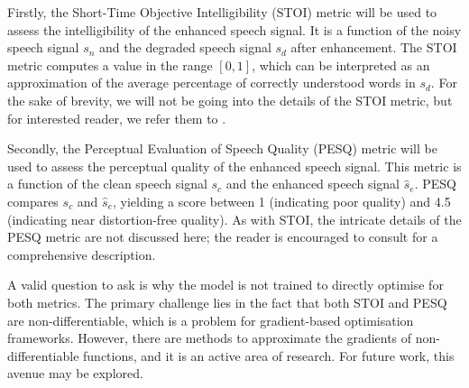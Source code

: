 \documentclass[logo,bsc,singlespacing,parskip,online]{infthesis}
\begin{document}
Firstly, the Short-Time Objective Intelligibility (STOI) \citep{taal_algorithm_2011} metric will be used to assess the intelligibility of the enhanced speech signal.
It is a function of the noisy speech signal $s_n$ and the degraded speech signal $s_d$ after enhancement.
The STOI metric computes a value in the range \([0, 1]\), which can be interpreted as an approximation of the average percentage of correctly understood words in $s_d$. 
For the sake of brevity, we will not be going into the details of the STOI metric, but for interested reader, we refer them to \citet{taal_algorithm_2011}.

Secondly, the Perceptual Evaluation of Speech Quality (PESQ) \citep{rix_perceptual_2001} metric will be 
used to assess the perceptual quality of the enhanced speech signal. 
This metric is a function of the clean speech signal $s_c$ and the enhanced speech signal $\hat{s}_e$.
PESQ compares $s_c$ and $\hat{s}_e$, yielding a score between 1 (indicating poor quality) and 4.5 (indicating near distortion-free quality). 
As with STOI, the intricate details of the PESQ metric are not discussed here; the reader is encouraged to consult \citet{rix_perceptual_2001} for a comprehensive description.

A valid question to ask is why the model is not trained to directly optimise for both metrics. The primary challenge lies in the fact that both STOI and PESQ are non-differentiable,
which is a problem for gradient-based optimisation frameworks. However, there are methods to approximate the gradients of non-differentiable functions, and it is an active area of research.
For future work, this avenue may be explored. 
\end{document}
